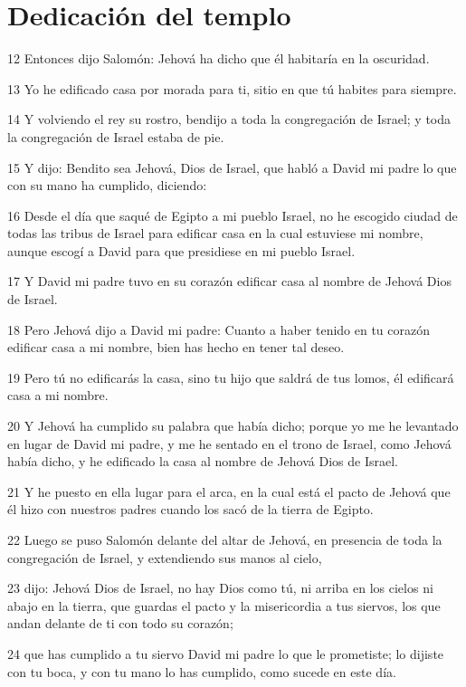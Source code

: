 \section*{Dedicación del templo}

\par 12 Entonces dijo Salomón: Jehová ha dicho que él habitaría en la oscuridad.
\par 13 Yo he edificado casa por morada para ti, sitio en que tú habites para siempre.
\par 14 Y volviendo el rey su rostro, bendijo a toda la congregación de Israel; y toda la congregación de Israel estaba de pie.
\par 15 Y dijo: Bendito sea Jehová, Dios de Israel, que habló a David mi padre lo que con su mano ha cumplido, diciendo:
\par 16 Desde el día que saqué de Egipto a mi pueblo Israel, no he escogido ciudad de todas las tribus de Israel para edificar casa en la cual estuviese mi nombre, aunque escogí a David para que presidiese en mi pueblo Israel. 
\par 17 Y David mi padre tuvo en su corazón edificar casa al nombre de Jehová Dios de Israel.
\par 18 Pero Jehová dijo a David mi padre: Cuanto a haber tenido en tu corazón edificar casa a mi nombre, bien has hecho en tener tal deseo. 
\par 19 Pero tú no edificarás la casa, sino tu hijo que saldrá de tus lomos, él edificará casa a mi nombre. 
\par 20 Y Jehová ha cumplido su palabra que había dicho; porque yo me he levantado en lugar de David mi padre, y me he sentado en el trono de Israel, como Jehová había dicho, y he edificado la casa al nombre de Jehová Dios de Israel.
\par 21 Y he puesto en ella lugar para el arca, en la cual está el pacto de Jehová que él hizo con nuestros padres cuando los sacó de la tierra de Egipto.
\par 22 Luego se puso Salomón delante del altar de Jehová, en presencia de toda la congregación de Israel, y extendiendo sus manos al cielo,
\par 23 dijo: Jehová Dios de Israel, no hay Dios como tú, ni arriba en los cielos ni abajo en la tierra, que guardas el pacto y la misericordia a tus siervos, los que andan delante de ti con todo su corazón;
\par 24 que has cumplido a tu siervo David mi padre lo que le prometiste; lo dijiste con tu boca, y con tu mano lo has cumplido, como sucede en este día.
